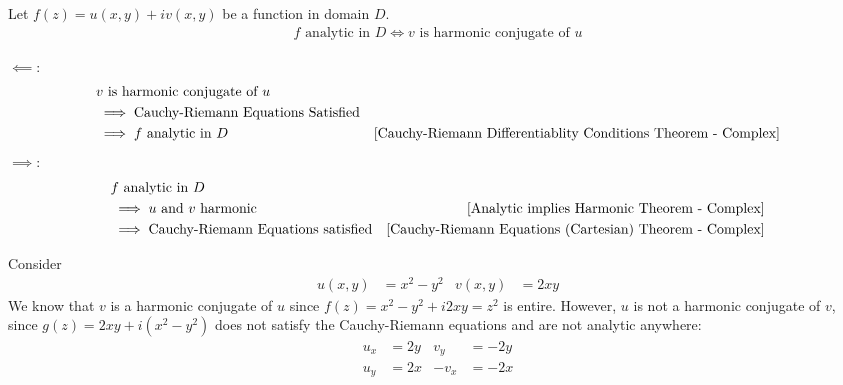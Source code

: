 \documentclass[12pt, english]{book}
\makeatletter
\renewenvironment{proof}[1][\proofname]{\par
	\pushQED{\qed}%
	\normalfont \topsep6\p@\@plus6\p@\relax
	\list{}{%
		\settowidth{\leftmargin}{\itshape\proofname:\hskip\labelsep}%
		\setlength{\labelwidth}{0pt}%
		\setlength{\itemindent}{-\leftmargin}%
		}%
	\item[\hskip\labelsep\itshape#1\@addpunct{:}]\ignorespaces
	}{\popQED\endlist\@endpefalse}
\makeatother
\begin{document}
	\begin{theorem}
		\label{Analytic Implies v harmonic conjugate of u Theorem - Complex}
		Let \(f(z) = u(x,y) + iv(x,y)\) be a function in domain \(D\).
		\begin{align*}
			f \text{ analytic in } D \iff v \text{ is harmonic conjugate of } u
		\end{align*}
	\end{theorem}
	\begin{proof}
		\underline{\(\impliedby\)}: \newline
		\begin{align*}
			&v \text{ is harmonic conjugate of } u \\
			&\implies \text{Cauchy-Riemann Equations Satisfied} \\
			&\implies f \text{ analytic in } D & \text{\Cref{Cauchy-Riemann Differentiablity Conditions Theorem - Complex}}
		\end{align*}
		\underline{\(\implies\)}: \newline
		\begin{align*}
			&f \text{ analytic in } D \\
			&\implies u \text{ and } v \text{ harmonic } 
				& \text{\Cref{Analytic implies Harmonic Theorem - Complex}} \\
			&\implies \text{Cauchy-Riemann Equations satisfied} 
				& \text{\Cref{Cauchy-Riemann Equations (Cartesian) Theorem - Complex}}
		\end{align*}
	\end{proof}
	
	\begin{example}
		Consider 
		\begin{align*}
			u(x,y) &= x^2 - y^2 & v(x,y) &= 2xy
		\end{align*}
		We know that \(v\) is a harmonic conjugate of \(u\) since \(f(z) = x^2 - y^2 + i2xy = z^2\) is entire. However, \(u\) is not a harmonic conjugate of \(v\), since \(g(z) = 2xy + i(x^2 - y^2)\) does not satisfy the Cauchy-Riemann equations and are not analytic anywhere:
		\begin{align*}
			u_x &= 2y & v_y &= -2y \\
			u_y &= 2x & -v_x &= -2x
		\end{align*}
	\end{example}
\end{document}
